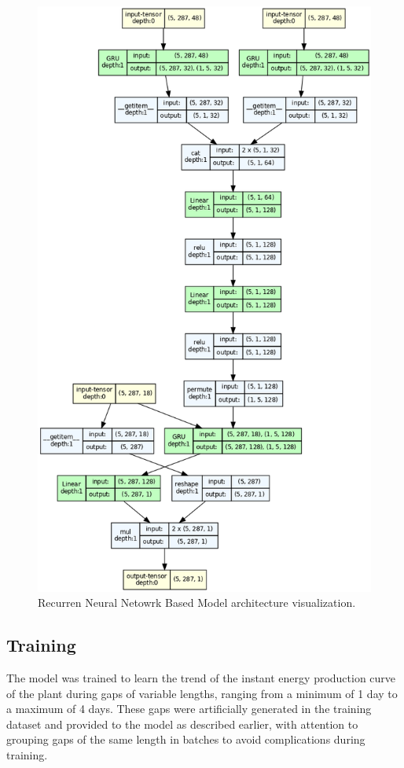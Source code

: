 \begin{figure}[H]
	\centering
	\includegraphics[height=.9\textheight]{chapters/3_models/imgs/grrun/grrunarchitecture.png}
	\caption{Recurren Neural Netowrk Based Model architecture visualization.}\label{fig:grrunarchitecture}
\end{figure}

\subsection{Training}
The model was trained to learn the trend of the instant energy production curve of
the plant during gaps of variable lengths, ranging from a minimum of 1
day to a maximum of 4 days.
These gaps were artificially generated in the training dataset and provided to the model
as described earlier, with attention to grouping gaps of the same length in
batches to avoid complications during training.

